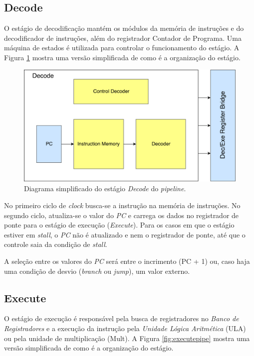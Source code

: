\documentclass[11pt,a4paper,titlepage]{article}
\begin{document}
\subsection{Decode}

O estágio de decodificação mantém os módulos da memória de instruções e do decodificador de instruções, além do registrador Contador de Programa. Uma máquina de estados é utilizada para controlar o funcionamento do estágio. A Figura \ref{fig:decodepipe} mostra uma versão simplificada de como é a organização do estágio.

\begin{figure}[!h]
\centering
\includegraphics[scale=0.4]{images/decodepipe.pdf}
\caption{Diagrama simplificado do estágio \textit{Decode} do \textit{pipeline}.}
\label{fig:decodepipe}
\end{figure}

No primeiro ciclo de \textit{clock} busca-se a instrução na memória de instruções. No segundo ciclo, atualiza-se o valor do \textit{PC} e carrega os dados no registrador de ponte para o estágio de execução (\textit{Execute}). Para os casos em que o estágio estiver em \textit{stall}, o \textit{PC} não é atualizado e nem o registrador de ponte, até que o controle saia da condição de \textit{stall}.

A seleção entre os valores do \textit{PC} será entre o incrimento (PC + 1) ou, caso haja uma condição de desvio (\textit{branch} ou \textit{jump}), um valor externo.

\subsection{Execute}

O estágio de execução é responsável pela busca de registradores no \textit{Banco de Registradores} e a execução da instrução pela \textit{Unidade Lógica Aritmética} (ULA) ou pela unidade de multiplicação (Mult). A Figura \ref{fig:executepipe} mostra uma versão simplificada de como é a organização do estágio.
\end{document}
